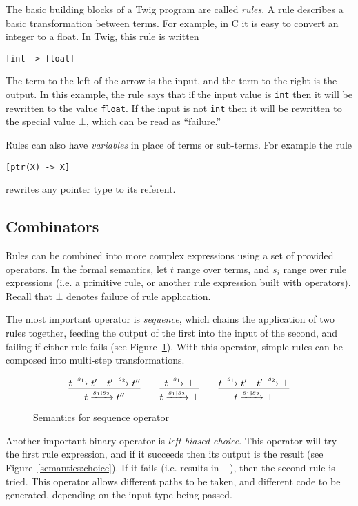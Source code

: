 The basic building blocks of a Twig program are called \emph{rules}. A rule
describes a basic transformation between terms. For example, in C it is easy
to convert an integer to a float. In Twig, this rule is written

\begin{verbatim}
[int -> float]
\end{verbatim}

The term to the left of the arrow is the input, and the term to the right is
the output. In this example, the rule says that if the input value is
\texttt{int} then it will be rewritten to the value \texttt{float}. If the
input is not \texttt{int} then it will be rewritten to the special value
$\bot$, which can be read as ``failure.''

Rules can also have \emph{variables} in place of terms or sub-terms. For
example the rule

\begin{verbatim}
[ptr(X) -> X]
\end{verbatim}

rewrites any pointer type to its referent.

\subsection{Combinators}

Rules can be combined into more complex expressions using a set of provided
operators. In the formal semantics, let $t$ range over terms, and $s_i$ range
over rule expressions (i.e. a primitive rule, or another rule expression built
with operators). Recall that $\bot$ denotes failure of rule application.

The most important operator is \emph{sequence}, which chains the application
of two rules together, feeding the output of the first into the input of the
second, and failing if either rule fails (see
Figure~\ref{semantics:sequence}). With this operator, simple rules can be
composed into multi-step transformations.

\begin{figure}[ht]
\label{semantics:sequence}
\[
\infer{t \arr{s_1;s_2} t''}{t \arr{s_1} t' \quad t' \arr{s_2} t''}
\qquad 
\infer{t \arr{s_1;s_2} \bot}{t \arr{s_1} \bot}
\qquad
\infer{t \arr{s_1;s_2} \bot}{t \arr{s_1} t' \quad t' \arr{s_2} \bot}
\]
\caption{Semantics for sequence operator}
\end{figure}

Another important binary operator is \emph{left-biased choice}. This operator
will try the first rule expression, and if it succeeds then its output is the
result (see Figure~\ref{semantics:choice}). If it fails (i.e. results in
$\bot$), then the second rule is tried. This operator allows different paths
to be taken, and different code to be generated, depending on the input type
being passed.

